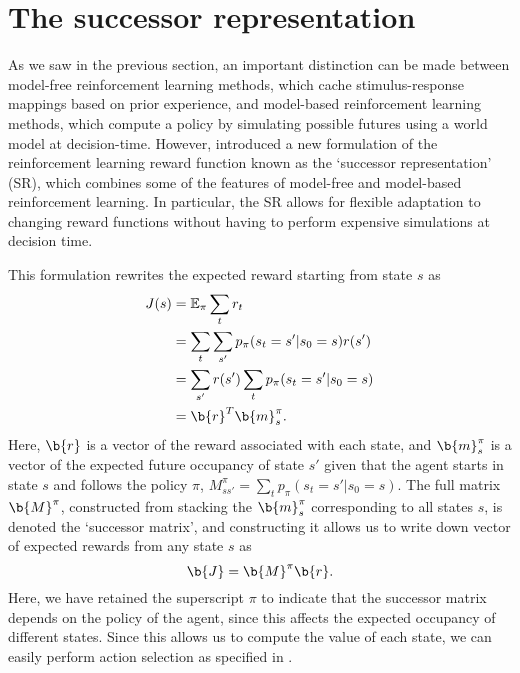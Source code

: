\section{The successor representation}
\label{sec:SR}

As we saw in the previous section, an important distinction can be made between model-free reinforcement learning methods, which cache stimulus-response mappings based on prior experience, and model-based reinforcement learning methods, which compute a policy by simulating possible futures using a world model at decision-time.
However, \citet{dayan1993improving} introduced a new formulation of the reinforcement learning reward function known as the `successor representation' (SR), which combines some of the features of model-free and model-based reinforcement learning.
In particular, the SR allows for flexible adaptation to changing reward functions without having to perform expensive simulations at decision time.

This formulation rewrites the expected reward starting from state $s$ as
\begin{align}
    J(s) &= \mathbb{E}_\pi \sum_t r_t \\
    &= \sum_t \sum_{s'} p_\pi(s_t = s' | s_0 = s) r(s')\\
    &= \sum_{s'} r(s') \sum_t p_\pi(s_t = s' | s_0 = s)\\
    &= \b{r}^T \b{m}^\pi_s.
\end{align}
Here, $\b{r}$ is a vector of the reward associated with each state, and $\b{m}^\pi_s$ is a vector of the expected future occupancy of state $s'$ given that the agent starts in state $s$ and follows the policy $\pi$, $M^\pi_{s s'} = \sum_t p_\pi(s_t = s' | s_0 = s)$.
The full matrix $\b{M}^\pi$, constructed from stacking the $\b{m}^\pi_s$ corresponding to all states $s$, is denoted the `successor matrix', and constructing it allows us to write down vector of expected rewards from any state $s$ as
\begin{equation}
    \b{J} = \b{M}^\pi \b{r}.
\end{equation}
Here, we have retained the superscript $\pi$ to indicate that the successor matrix depends on the policy of the agent, since this affects the expected occupancy of different states.
Since this allows us to compute the value of each state, we can easily perform action selection as specified in .

